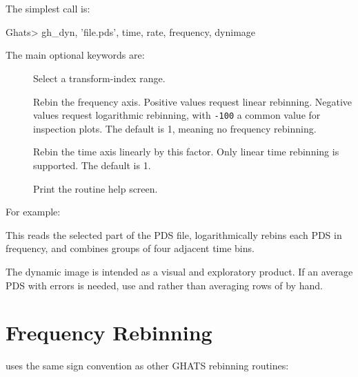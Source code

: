 \section{}

The simplest call is:

\begin{ghatsconsole}
Ghats> gh_dyn, 'file.pds', time, rate, frequency, dynimage
\end{ghatsconsole}

The main optional keywords are:

\begin{description}
\item[] Select a transform-index range.
\item[] Rebin the frequency axis.  Positive values request
  linear rebinning.  Negative values request logarithmic rebinning, with
  \texttt{-100} a common value for inspection plots.  The default is 1, meaning
  no frequency rebinning.
\item[] Rebin the time axis linearly by this factor.  Only
  linear time rebinning is supported.  The default is 1.
\item[] Print the routine help screen.
\end{description}

For example:


This reads the selected part of the PDS file, logarithmically rebins each PDS
in frequency, and combines groups of four adjacent time bins.

\begin{ghatsnote}
The dynamic image is intended as a visual and exploratory product.  If an
average PDS with errors is needed, use  and 
rather than averaging rows of  by hand.
\end{ghatsnote}

\section{Frequency Rebinning}

 uses the same sign convention as other GHATS rebinning
routines:

